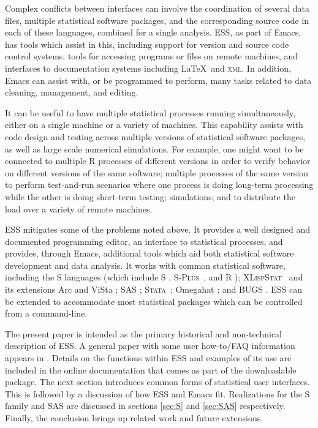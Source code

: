 \documentclass{article}
\newcommand*{\Splus}{\textsc{S-Plus}}
\newcommand*{\XLispStat}{\textsc{XLispStat}}
\newcommand*{\Stata}{\textsc{Stata}}
\begin{document}
Complex conflicts between interfaces can involve the coordination of
several data files, multiple statistical software packages, and the
corresponding source code in each of these languages, combined for a
single analysis.  ESS, as part of Emacs, has tools which assist in
this, including support for version and source code control systems,
tools for accessing programs or files on remote machines, and
interfaces to documentation systems including \LaTeX\ and
\textsc{xml}.  In addition, Emacs can assist with, or be programmed to
perform, many tasks related to data cleaning, management, and editing.

It can be useful to have multiple statistical processes running simultaneously, 
either on a single machine or a variety of machines.  This capability
assists with code design and testing across multiple versions of
statistical software packages, as well as large scale numerical
simulations.  For example, one might want to be connected to multiple
R processes of different versions in order to verify behavior on
different versions of the same software; multiple processes of the
same version to perform test-and-run scenarios where one process is
doing long-term processing while the other is doing short-term
testing; simulations; and to distribute the load over a variety of
remote machines.

ESS mitigates some of the problems noted above.  It provides a well
designed and documented programming editor, an interface to
statistical processes, and provides, through Emacs, additional tools
which aid both statistical software development and data analysis.  It
works with common statistical software, including the S languages
(which include S \citep{BecRCW88,ChaJH92,ChaJ98}, \Splus\ 
\citep{Splus}, and R \citep{ihak:gent:1996}); \XLispStat\ 
\citep{Tier90} and its extensions Arc \citep{Cook:Weisberg:1999} and
ViSta \citep{youn:fald:mcfa:1992}; SAS \citep{SAS:8.0}; \Stata\ 
\citep{Stata:6.0}; Omegahat \citep{DTLang:2000}; and BUGS
\citep{SpieThomBest:1999}.  ESS can be extended to accommodate most
statistical packages which can be controlled from a command-line.

The present paper is intended as the primary historical and
non-technical description of ESS.  A general paper with some user
how-to/FAQ information appears in \citep{heiberger:dsc:2001}.  Details
on the functions within ESS and examples of its use are included in
the online documentation that comes as part of the downloadable
package.  The next section introduces common forms of statistical user
interfaces.  This is followed by a discussion of how ESS and Emacs
fit.  Realizations for the S family and SAS are discussed in sections
\ref{sec:S} and \ref{sec:SAS} respectively.  Finally, the conclusion
brings up related work and future extensions.
\end{document}
